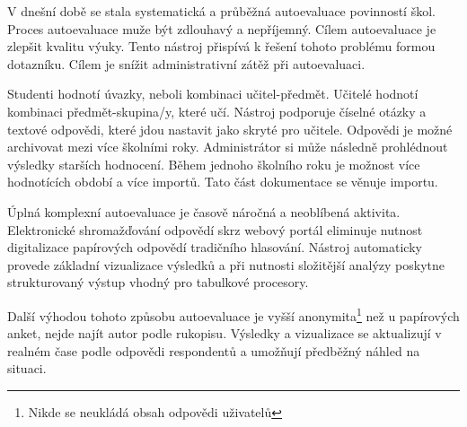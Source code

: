V dnešní době se stala systematická a průběžná autoevaluace povinností škol.
Proces autoevaluace muže být zdlouhavý a nepříjemný. Cílem autoevaluace je zlepšit kvalitu výuky.\cite{sbornik-autoevaluace} 
Tento nástroj přispívá k řešení tohoto problému formou dotazníku.
Cílem je snížit administrativní zátěž při autoevaluaci.

Studenti hodnotí úvazky, neboli kombinaci učitel-předmět. 
Učitelé hodnotí kombinaci předmět-skupina/y, které učí. 
Nástroj podporuje číselné otázky a textové odpovědi, které jdou nastavit jako skryté pro učitele.
Odpovědi je možné archivovat mezi více školními roky. Administrátor si může následně prohlédnout výsledky starších hodnocení. 
Během jednoho školního roku je možnost více hodnotících období a více importů.
Tato část dokumentace se věnuje importu.

Úplná komplexní autoevaluace je časově náročná a neoblíbená aktivita.\cite{sbornik-autoevaluace}
Elektronické shromažďování odpovědí skrz webový portál eliminuje nutnost digitalizace papírových odpovědí tradičního hlasování. 
Nástroj automaticky provede základní vizualizace výsledků a při nutnosti složitější analýzy poskytne strukturovaný výstup vhodný pro tabulkové procesory.

Další výhodou tohoto způsobu autoevaluace je vyšší anonymita\footnote{Nikde se neukládá obsah odpovědi uživatelů} než u papírových anket, nejde najít autor podle rukopisu.  
  Výsledky a vizualizace se aktualizují v realném čase podle odpovědi respondentů a umožňují předběžný náhled na situaci.
